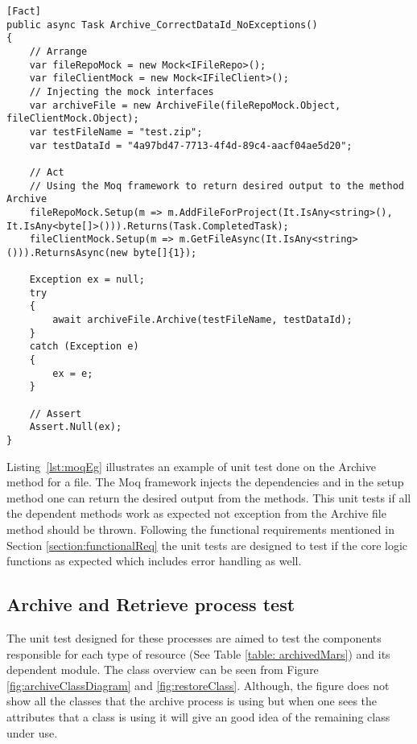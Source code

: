 \begin{lstlisting}[language={[Sharp]C}, caption={Example of faking objects using Moq framework}, captionpos=b,label={lst:moqEg}]
[Fact]
public async Task Archive_CorrectDataId_NoExceptions()
{
    // Arrange
    var fileRepoMock = new Mock<IFileRepo>();
    var fileClientMock = new Mock<IFileClient>();
    // Injecting the mock interfaces 
    var archiveFile = new ArchiveFile(fileRepoMock.Object, fileClientMock.Object);
    var testFileName = "test.zip";
    var testDataId = "4a97bd47-7713-4f4d-89c4-aacf04ae5d20";
    
    // Act
    // Using the Moq framework to return desired output to the method Archive
    fileRepoMock.Setup(m => m.AddFileForProject(It.IsAny<string>(), It.IsAny<byte[]>())).Returns(Task.CompletedTask);
    fileClientMock.Setup(m => m.GetFileAsync(It.IsAny<string>())).ReturnsAsync(new byte[]{1});

    Exception ex = null;
    try
    {
        await archiveFile.Archive(testFileName, testDataId);
    }
    catch (Exception e)
    {
        ex = e;
    }
    
    // Assert
    Assert.Null(ex);
}
\end{lstlisting}

Listing~\ref{lst:moqEg} illustrates an example of unit test done on the Archive method for a file. The Moq framework injects the dependencies and in the setup method
one can return the desired output from the methods. This unit tests if all the dependent methods work as expected not exception from the Archive file method should be
thrown. 
Following the functional requirements mentioned in Section \ref{section:functionalReq} the unit tests are designed to test if the core logic functions as expected which includes error handling as well.

\subsection{Archive and Retrieve process test}
The unit test designed for these processes are aimed to test the components responsible for each type of resource (See Table \ref{table: archivedMars}) and its 
dependent module. The class overview can be seen from Figure \ref{fig:archiveClassDiagram} and \ref{fig:restoreClass}. Although, the figure does not show all the classes that the archive process is using
but when one sees the attributes that a class is using it will give an good idea of the remaining class under use.

